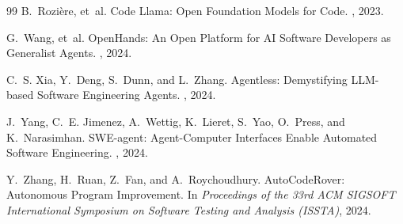 \documentclass[10pt,twocolumn,letterpaper]{article}
\begin{document}
\begin{thebibliography}{99}
B.~Rozi{\`e}re, et~al.
\newblock Code Llama: Open Foundation Models for Code.
, 2023.

G.~Wang, et~al.
\newblock OpenHands: An Open Platform for AI Software Developers as Generalist Agents.
, 2024.

C.~S. Xia, Y.~Deng, S.~Dunn, and L.~Zhang.
\newblock Agentless: Demystifying LLM-based Software Engineering Agents.
, 2024.

J.~Yang, C.~E. Jimenez, A.~Wettig, K.~Lieret, S.~Yao, O.~Press, and K.~Narasimhan.
\newblock SWE-agent: Agent-Computer Interfaces Enable Automated Software Engineering.
, 2024.

Y.~Zhang, H.~Ruan, Z.~Fan, and A.~Roychoudhury.
\newblock AutoCodeRover: Autonomous Program Improvement.
\newblock In {\em Proceedings of the 33rd ACM SIGSOFT International Symposium on Software Testing and Analysis (ISSTA)}, 2024.

\end{thebibliography}
\end{document}
